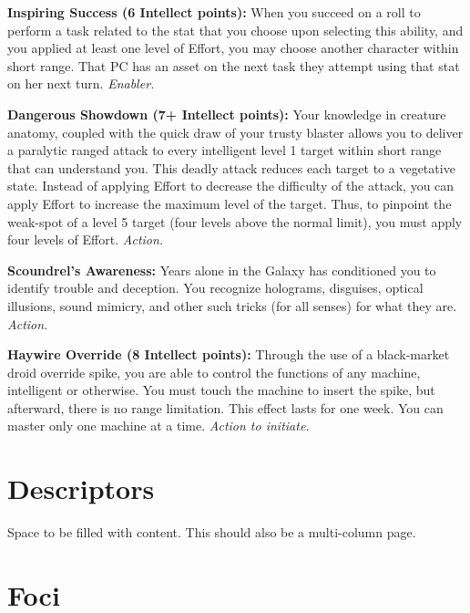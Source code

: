 \documentclass[a4paper,10pt,final,twocolumn,oneside]{book}
\newcommand{\itemAbility}[2]{\textcolor{25gray}{\textbullet\textbf{ #1:}}{ #2}\par}
\newcommand{\enabler}{\textit{ Enabler.}}
\newcommand{\action}{\textit{ Action.}}
\newcommand{\actionInit}{\textit{ Action to initiate.}}
\begin{document}
\itemAbility{Inspiring Success (6 Intellect points)}{When you succeed on a roll to perform a task related to the stat that you choose upon selecting this ability, and you applied at least one level of Effort, you may choose another character within short range. That PC has an asset on the next task they attempt using that stat on her next turn.\enabler}

\itemAbility{Dangerous Showdown (7+ Intellect points)}{Your knowledge in creature anatomy, coupled with the quick draw of your trusty blaster allows you to deliver a paralytic ranged attack to every intelligent level 1 target within short range that can understand you. This deadly attack reduces each target to a vegetative state. Instead of applying Effort to decrease the difficulty of the attack, you can apply Effort to increase the maximum level of the target. Thus, to pinpoint the weak-spot of a level 5 target (four levels above the normal limit), you must apply four levels of Effort.\action}

\itemAbility{Scoundrel's Awareness}{Years alone in the Galaxy has conditioned you to identify trouble and deception. You recognize holograms, disguises, optical illusions, sound mimicry, and other such tricks (for all senses) for what they are.\action}

\itemAbility{Haywire Override (8 Intellect points)}{ Through the use of a black-market droid override spike, you are able to control the functions of any machine, intelligent or otherwise. You must touch the machine to insert the spike, but afterward, there is no range limitation. This effect lasts for one week. You can master only one machine at a time.\actionInit}



\clearpage

\section{Descriptors} %
\label{sec:descriptors}

Space to be filled with content. This should also be a multi-column page.


\clearpage

\section{Foci} %
\label{sec:foci}
\end{document}
